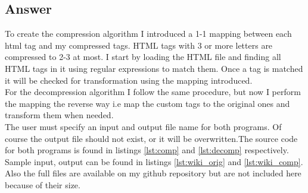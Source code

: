 \documentclass{article}
\begin{document}
\subsection*{Answer}
To create the compression algorithm I introduced a 1-1 mapping between each html tag and my compressed tags. HTML tags with 3 or more letters are compressed to 2-3 at most. I start by loading the HTML file and finding all HTML tags in it using regular expressions to match them. Once a tag is matched it will be checked for transformation using the mapping introduced. 
\\For the decompression algorithm I follow the same procedure, but now I perform the mapping the reverse way i.e map the custom tags to the original ones and transform them when needed. 
\\The user must specify an input and output file name for both programs. Of course the output file should not exist, or it will be overwritten.The source code for both programs is found in listings \ref{lst:comp} and \ref{lst:decomp} respectively. Sample input, output can be found in listings \ref{lst:wiki_orig} and \ref{lst:wiki_comp}.
Also the full files are available on my github repository but are not included here because of their size.\\





\end{document}
